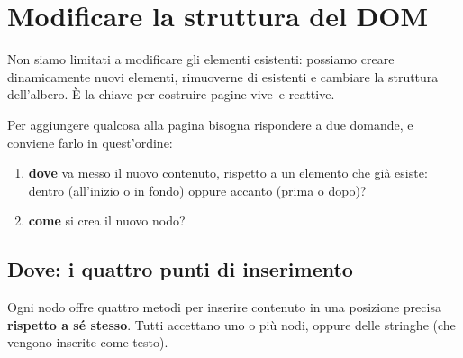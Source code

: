 
\section{Modificare la struttura del DOM}

Non siamo limitati a modificare gli elementi esistenti: possiamo creare
dinamicamente nuovi elementi, rimuoverne di esistenti e cambiare la struttura
dell'albero. È la chiave per costruire pagine \guillemotleft vive\guillemotright\ e reattive.

Per aggiungere qualcosa alla pagina bisogna rispondere a due domande, e conviene
farlo in quest'ordine:

\begin{enumerate}
  \item \textbf{dove} va messo il nuovo contenuto, rispetto a un elemento che già
        esiste: dentro (all'inizio o in fondo) oppure accanto (prima o dopo)?
  \item \textbf{come} si crea il nuovo nodo?
\end{enumerate}

\subsection{Dove: i quattro punti di inserimento}

Ogni nodo offre quattro metodi per inserire contenuto in una posizione precisa
\textbf{rispetto a sé stesso}. Tutti accettano uno o più nodi, oppure delle
stringhe (che vengono inserite come testo).

